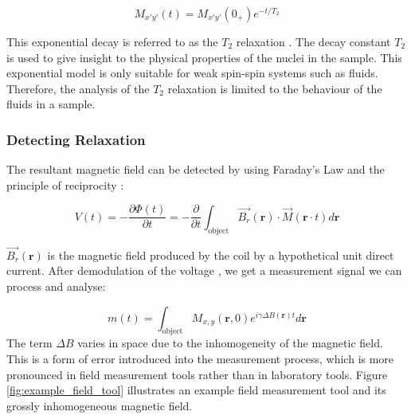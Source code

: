 \begin{equation}
    M_{x'y'}(t) = M_{x'y'}(0_+) e^{-t/T_2}
    \label{eq:T2ExpoenetialRelaxation}
\end{equation}

This exponential decay is referred to as the $T_2$ relaxation  \cite{NMRSignalProcessingBook}. The decay constant $T_2$ is used to give insight to the physical properties of the nuclei in the sample. This exponential model is only suitable for weak spin-spin systems such as fluids. Therefore, the analysis of the $T_2$ relaxation is limited to the behaviour of the fluids in a sample.

\subsubsection{Detecting Relaxation}
The resultant magnetic field can be detected by using Faraday's Law and the principle of reciprocity \cite{NMRSignalProcessingBook}:

\begin{equation}
    V(t) = -\frac{\partial \Phi(t)}{\partial t} = - \frac{\partial}{\partial t} \int_\text{object} \vec{B_r}(\bm{r}) \cdot \vec{M}(\bm{r} \cdot t) d \bm{r}
    \label{eq:detectionFaraday}
\end{equation}

$\vec{B_r}(\bm{r})$ is the magnetic field produced by the coil by a hypothetical unit direct current. After demodulation of the voltage \cite{NMRSignalProcessingBook}, we get a measurement signal we can process and analyse:

\begin{equation}
    m(t) = \int_{\text{object}} M_{x,y}(\bm{r}, 0 )e^{i\gamma \Delta B(\bm{r})t} d \bm{r}
    \label{eq:detectionFinalSignal}
\end{equation}
The term $\Delta B $ varies in space due to the inhomogeneity of the magnetic field. This is a form of error introduced into the measurement process, which is more pronounced in field measurement tools rather than in laboratory tools. Figure \ref{fig:example_field_tool} illustrates an example field measurement tool and its grossly inhomogeneous magnetic field.

